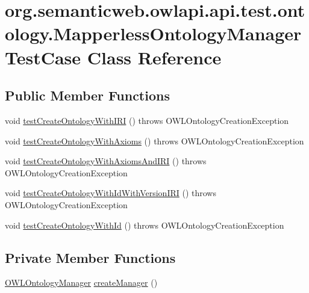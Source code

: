 \hypertarget{classorg_1_1semanticweb_1_1owlapi_1_1api_1_1test_1_1ontology_1_1_mapperless_ontology_manager_test_case}{\section{org.\-semanticweb.\-owlapi.\-api.\-test.\-ontology.\-Mapperless\-Ontology\-Manager\-Test\-Case Class Reference}
\label{classorg_1_1semanticweb_1_1owlapi_1_1api_1_1test_1_1ontology_1_1_mapperless_ontology_manager_test_case}
}
\subsection*{Public Member Functions}
\begin{DoxyCompactItemize}
\item 
void \hyperlink{classorg_1_1semanticweb_1_1owlapi_1_1api_1_1test_1_1ontology_1_1_mapperless_ontology_manager_test_case_a0717f0a82b26656865e95cf8464d1902}{test\-Create\-Ontology\-With\-I\-R\-I} ()  throws O\-W\-L\-Ontology\-Creation\-Exception 
\item 
void \hyperlink{classorg_1_1semanticweb_1_1owlapi_1_1api_1_1test_1_1ontology_1_1_mapperless_ontology_manager_test_case_a0ddb257feb35a557769ba25035047e26}{test\-Create\-Ontology\-With\-Axioms} ()  throws O\-W\-L\-Ontology\-Creation\-Exception 
\item 
void \hyperlink{classorg_1_1semanticweb_1_1owlapi_1_1api_1_1test_1_1ontology_1_1_mapperless_ontology_manager_test_case_a261dd899d484b986fd2682364052590e}{test\-Create\-Ontology\-With\-Axioms\-And\-I\-R\-I} ()  throws O\-W\-L\-Ontology\-Creation\-Exception 
\item 
void \hyperlink{classorg_1_1semanticweb_1_1owlapi_1_1api_1_1test_1_1ontology_1_1_mapperless_ontology_manager_test_case_adfa3684ced63c1ff2867231cca05c8cb}{test\-Create\-Ontology\-With\-Id\-With\-Version\-I\-R\-I} ()  throws O\-W\-L\-Ontology\-Creation\-Exception 
\item 
void \hyperlink{classorg_1_1semanticweb_1_1owlapi_1_1api_1_1test_1_1ontology_1_1_mapperless_ontology_manager_test_case_a7e6fc8ff105dd54c834afa6ada20ebb8}{test\-Create\-Ontology\-With\-Id} ()  throws O\-W\-L\-Ontology\-Creation\-Exception 
\end{DoxyCompactItemize}
\subsection*{Private Member Functions}
\begin{DoxyCompactItemize}
\item 
\hyperlink{interfaceorg_1_1semanticweb_1_1owlapi_1_1model_1_1_o_w_l_ontology_manager}{O\-W\-L\-Ontology\-Manager} \hyperlink{classorg_1_1semanticweb_1_1owlapi_1_1api_1_1test_1_1ontology_1_1_mapperless_ontology_manager_test_case_a0f535a72ee6dca3942466e39db06ab8f}{create\-Manager} ()
\end{DoxyCompactItemize}
